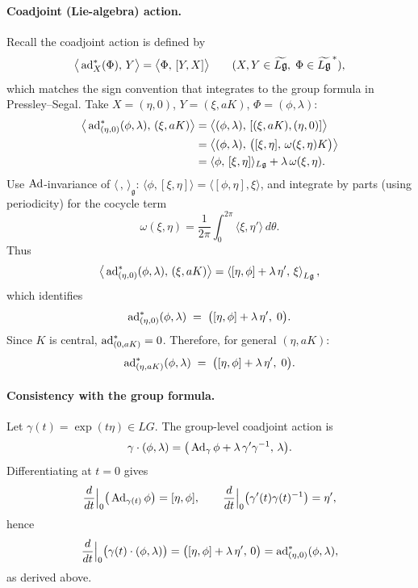 \documentclass[12pt]{article}
\begin{document}
\begin{remark}
    \paragraph{Coadjoint (Lie-algebra) action.}
    Recall the coadjoint action is defined by
    \[
        \big\langle \operatorname{ad}^*_{X}(\Phi),\,Y\big\rangle
        = \big\langle \Phi,\,[Y,X]\big\rangle
        \qquad (X,Y\in \widetilde{L\mathfrak g},\;\Phi\in \widetilde{L\mathfrak g}^{\,*}),
    \]
    which matches the sign convention that integrates to the group formula in Pressley--Segal.
    Take $X=(\eta,0)$, $Y=(\xi,aK)$, $\Phi=(\phi,\lambda)$:
    \begin{align*}
        \big\langle \operatorname{ad}^*_{(\eta,0)}(\phi,\lambda),\,(\xi,aK)\big\rangle
         & = \big\langle (\phi,\lambda),\,[(\xi,aK),(\eta,0)]\big\rangle                      \\
         & = \big\langle (\phi,\lambda),\,\big([\xi,\eta],\,\omega(\xi,\eta)K\big)\big\rangle \\
         & = \langle \phi,\,[\xi,\eta]\rangle_{L\mathfrak g} + \lambda\,\omega(\xi,\eta).
    \end{align*}
    Use $\operatorname{Ad}$-invariance of $\langle\,,\,\rangle_{\mathfrak g}$:
    $\langle \phi,[\xi,\eta]\rangle=\langle [\phi,\eta],\xi\rangle$, and integrate by parts
    (using periodicity) for the cocycle term
    \[
        \omega(\xi,\eta) = \frac{1}{2\pi}\int_0^{2\pi}\!\!\langle \xi,\eta'\rangle\,d\theta.
    \]
    Thus
    \[
        \big\langle \operatorname{ad}^*_{(\eta,0)}(\phi,\lambda),\,(\xi,aK)\big\rangle
        = \left\langle [\eta,\phi]+\lambda\,\eta',\,\xi\right\rangle_{L\mathfrak g},
    \]
    which identifies
    \[
        \operatorname{ad}^*_{(\eta,0)}(\phi,\lambda)\;=\;\big([\eta,\phi]+\lambda\,\eta',\;0\big).
    \]
    Since $K$ is central, $\operatorname{ad}^*_{(0,aK)}=0$. Therefore, for general $(\eta,aK)$:
    \[
        \operatorname{ad}^*_{(\eta,aK)}(\phi,\lambda) \;=\; \big([\eta,\phi]+\lambda\,\eta',\;0\big).
    \]

    \paragraph{Consistency with the group formula.}
    Let $\gamma(t)=\exp(t\eta)\in LG$. The group-level coadjoint action is
    \[
        \gamma\cdot(\phi,\lambda)
        = \big(\operatorname{Ad}_\gamma\phi+\lambda\,\gamma'\gamma^{-1},\,\lambda\big).
    \]
    Differentiating at $t=0$ gives
    \[
        \frac{d}{dt}\Big|_{0}\big(\operatorname{Ad}_{\gamma(t)}\phi\big)=[\eta,\phi],
        \qquad
        \frac{d}{dt}\Big|_{0}\big(\gamma'(t)\gamma(t)^{-1}\big)=\eta',
    \]
    hence
    \[
        \frac{d}{dt}\Big|_{0}\big(\gamma(t)\cdot(\phi,\lambda)\big)
        = \big([\eta,\phi]+\lambda\,\eta',\,0\big)=\operatorname{ad}^*_{(\eta,0)}(\phi,\lambda),
    \]
    as derived above.
\end{remark}
\end{document}
